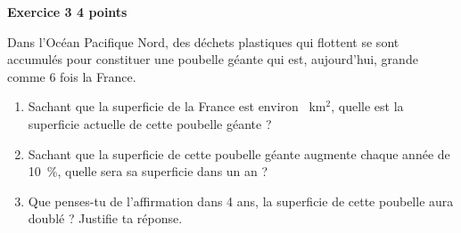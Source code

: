 \textbf{Exercice 3 \hfill 4 points}

\medskip

Dans l'Océan Pacifique Nord, des déchets plastiques qui flottent se sont accumulés pour constituer une poubelle géante qui est, aujourd'hui, grande comme 6 fois la France.

\medskip
 
\begin{enumerate}
\item Sachant que la superficie de la France est environ ~km$^2$, quelle est la superficie actuelle de cette poubelle géante ? 
\item Sachant que la superficie de cette poubelle géante augmente chaque année de 10 \,\%, quelle sera sa superficie dans un an ? 
\item Que penses-tu de l'affirmation \og dans 4 ans, la superficie de cette poubelle aura doublé \fg{} ? Justifie ta réponse.
\end{enumerate}
 
\bigskip

